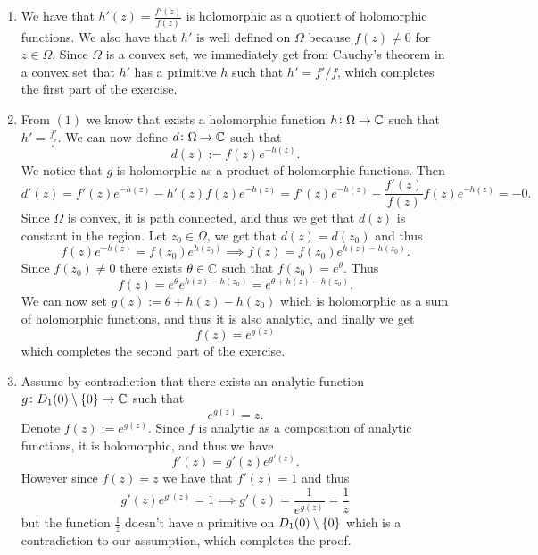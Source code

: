 \documentclass[11pt,a4paper]{article}
\begin{document}
\begin{solution} \phantom{}
\begin{enumerate}
  \item[(1)] We have that $h'(z) = \frac{f'(z)}{f(z)}$ is holomorphic as a
    quotient of holomorphic functions.
    We also have that $h'$ is well defined on $\Omega$ because
    $f(z) \neq 0$ for $z \in \Omega$.
    Since $\Omega$ is a convex set, we immediately get from Cauchy's
    theorem in a convex set that $h'$ has a primitive $h$ such that
    $h' = f' / f$, which completes the first part of the
    exercise.
  \item[(2)] From $(1)$ we know that exists a holomorphic function
    $h \colon \Omega \to \mathbb{C}$ such that $h' = \frac{f'}{f}$.
    We can now define $d \colon \Omega \to \mathbb{C}$ such that
    \[
      d(z) := f(z) e^{-h(z)}.
    \]
    We notice that $g$ is holomorphic as a product of holomorphic functions.
    Then
    \[
      d'(z) = f'(z) e^{-h(z)} - h'(z) f(z) e^{- h(z)} =
      f'(z) e^{-h(z)} - \frac{f'(z)}{f(z)} f(z) e^{-h(z)} = -0.
    \]
    Since $\Omega$ is convex, it is path connected, and thus we get that
    $d(z)$ is constant in the region.
    Let $z_0 \in \Omega$, we get that $d(z) = d(z_0)$ and thus
    \[
      f(z) e^{-h(z)} = f(z_0) e^{h(z_0)} \implies
      f(z) = f(z_0) e^{h(z) - h(z_0)}.
    \]
    Since $f(z_0) \neq 0$ there exists $\theta \in \mathbb{C}$ such that
    $f(z_0) = e^{\theta}$.
    Thus
    \[
      f(z) =
      e^{\theta} e^{h(z) - h(z_0)} =
      e^{\theta + h(z) - h(z_0)}.
    \]
    We can now set $g(z) := \theta + h(z) - h(z_0)$ which is holomorphic as
    a sum of holomorphic functions, and thus it is also analytic, and
    finally we get
    \[
      f(z) = e^{g(z)}
    \]
    which completes the second part of the exercise.
  \item[(3)] Assume by contradiction that there exists an analytic function
  $g \colon D_1(0) \setminus \left\{0\right\} \to \mathbb{C}$ such that
  \[
    e^{g(z)} = z.
  \]
  Denote $f(z) := e^{g(z)}$.
  Since $f$ is analytic as a composition of analytic functions, it is
  holomorphic, and thus we have
  \[
    f'(z) = g'(z) e^{g'(z)}.
  \]
  However since $f(z) = z$ we have that $f'(z) = 1$ and thus
  \[
    g'(z) e^{g'(z)} = 1 \implies
    g'(z) = \frac{1}{e^{g(z)}} = \frac{1}{z}
  \]
  but the function $\frac{1}{z}$ doesn't have a primitive on
  $D_1(0) \setminus \left\{0\right\}$ which is a contradiction to our assumption,
  which completes the proof.
\end{enumerate}
\end{solution}
\end{document}
